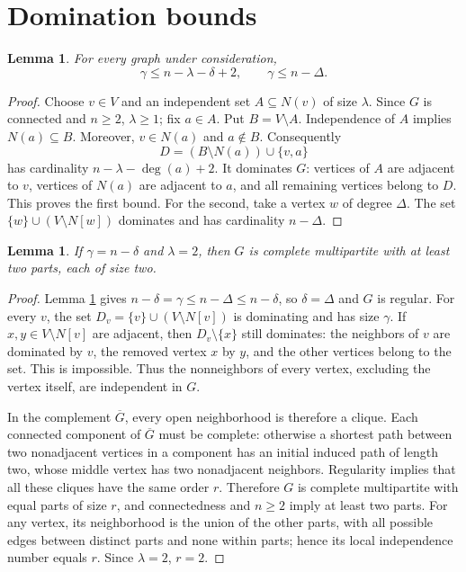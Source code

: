 \documentclass[11pt,a4paper]{article}
\newtheorem{lemma}[theorem]{Lemma}
\newcommand{\lam}{\lambda}
\begin{document}
\section{Domination bounds}
\begin{lemma}\label{dom}
For every graph under consideration,
\[
\gamma\le n-\lam-\delta+2,\qquad
\gamma\le n-\Delta.
\]
\end{lemma}
\begin{proof}
Choose $v\in V$ and an independent set $A\subseteq N(v)$ of size $\lam$. Since $G$ is connected and $n\ge2$, $\lam\ge1$; fix $a\in A$. Put $B=V\setminus A$. Independence of $A$ implies $N(a)\subseteq B$. Moreover, $v\in N(a)$ and $a\notin B$. Consequently
\[
D=(B\setminus N(a))\cup\{v,a\}
\]
has cardinality $n-\lam-\deg(a)+2$. It dominates $G$: vertices of $A$ are adjacent to $v$, vertices of $N(a)$ are adjacent to $a$, and all remaining vertices belong to $D$. This proves the first bound. For the second, take a vertex $w$ of degree $\Delta$. The set $\{w\}\cup(V\setminus N[w])$ dominates and has cardinality $n-\Delta$.
\end{proof}

\begin{lemma}\label{exception}
If $\gamma=n-\delta$ and $\lam=2$, then $G$ is complete multipartite with at least two parts, each of size two.
\end{lemma}
\begin{proof}
Lemma \ref{dom} gives $n-\delta=\gamma\le n-\Delta\le n-\delta$, so $\delta=\Delta$ and $G$ is regular. For every $v$, the set $D_v=\{v\}\cup(V\setminus N[v])$ is dominating and has size $\gamma$. If $x,y\in V\setminus N[v]$ are adjacent, then $D_v\setminus\{x\}$ still dominates: the neighbors of $v$ are dominated by $v$, the removed vertex $x$ by $y$, and the other vertices belong to the set. This is impossible. Thus the nonneighbors of every vertex, excluding the vertex itself, are independent in $G$.

In the complement $\overline G$, every open neighborhood is therefore a clique. Each connected component of $\overline G$ must be complete: otherwise a shortest path between two nonadjacent vertices in a component has an initial induced path of length two, whose middle vertex has two nonadjacent neighbors. Regularity implies that all these cliques have the same order $r$. Therefore $G$ is complete multipartite with equal parts of size $r$, and connectedness and $n\ge2$ imply at least two parts. For any vertex, its neighborhood is the union of the other parts, with all possible edges between distinct parts and none within parts; hence its local independence number equals $r$. Since $\lam=2$, $r=2$.
\end{proof}
\end{document}
